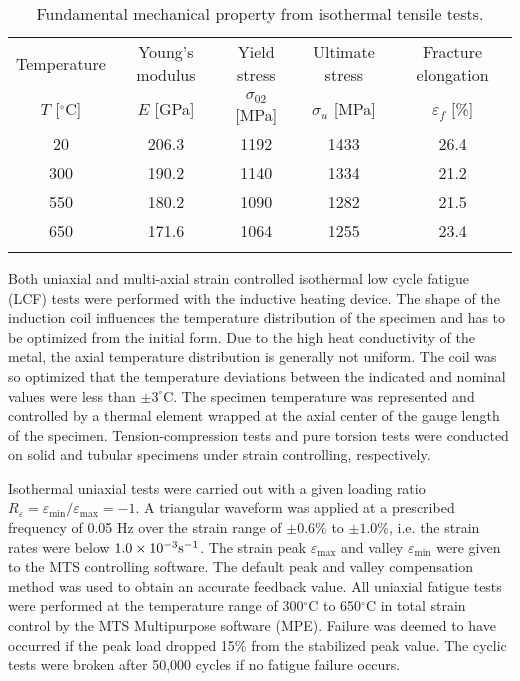 \documentclass[preprint,5p,twocolumn,11pt,sort&compress]{elsarticle}
\begin{document}
\begin{table*}[htbp]
  \centering
  \caption{Fundamental mechanical property from isothermal tensile tests.}
    \begin{tabular}{ccccc}
    \hline
    Temperature         & Young's modulus   & Yield stress            & Ultimate stress     & Fracture elongation\\
    $T$ [$^{\circ}$C]   & $E$ [GPa]         & $\sigma_{02}$ [MPa]  & $\sigma_u$ [MPa]    & $\varepsilon_f$ [\%]\\
    \hline
    20    & 206.3 & 1192 & 1433 & 26.4 \\
    300   & 190.2 & 1140 & 1334 & 21.2 \\
    550   & 180.2 & 1090 & 1282 & 21.5 \\
    650   & 171.6 & 1064 & 1255 & 23.4 \\
    \hline \\
    \end{tabular}%
  \label{tab:Basic_property}%
\end{table*}%

Both uniaxial and multi-axial strain controlled isothermal low cycle fatigue (LCF) tests were performed with the inductive heating device. The shape of the induction coil influences the temperature distribution of the specimen and has to be optimized from the initial form. Due to the high heat conductivity of the metal, the axial temperature distribution is generally not uniform. The coil was so optimized that the temperature deviations between the indicated and nominal values were less than $\pm3^{\circ}$C.
The specimen temperature was represented and controlled by a thermal element wrapped at the axial center of the gauge length of the specimen.
Tension-compression tests and pure torsion tests were conducted on solid and tubular specimens under strain controlling, respectively. 

Isothermal uniaxial tests were carried out with a given loading ratio $R_{\varepsilon}=\varepsilon_{\min}/\varepsilon_{\max}=-1$.
A triangular waveform was applied at a prescribed frequency of 0.05 Hz over the strain range of $\pm 0.6\%$ to $\pm 1.0\%$, i.e. the strain rates were below $1.0\times 10^{-3}\rm{s}^{-1}$.
The strain peak  $\varepsilon_{\max}$ and valley $\varepsilon_{\min}$ were given to the MTS controlling software.
The default peak and valley compensation method was used to obtain an accurate feedback value.
All uniaxial fatigue tests were performed at the temperature range of 300$^{\circ}$C to 650$^{\circ}$C in total strain control by the MTS Multipurpose software (MPE).
Failure was deemed to have occurred if the peak load dropped 15\% from the stabilized peak value. The cyclic tests were broken after 50,000 cycles if no fatigue failure occurs.
\end{document}
